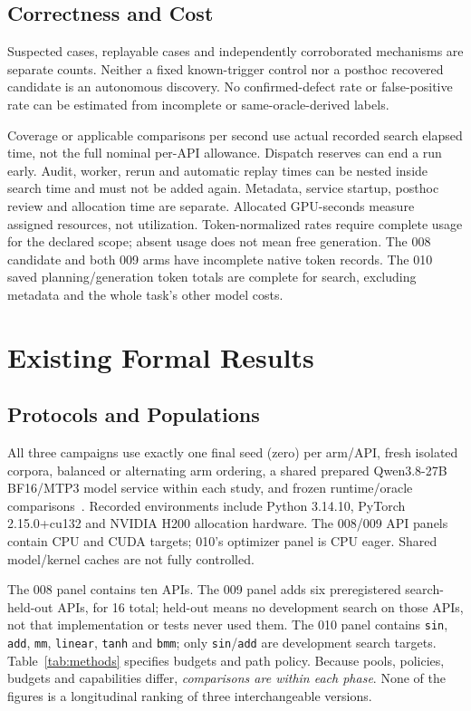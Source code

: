 \documentclass[conference]{IEEEtran}
\begin{document}
\subsection{Correctness and Cost}
Suspected cases, replayable cases and independently corroborated mechanisms are separate counts. Neither a fixed known-trigger control nor a posthoc recovered candidate is an autonomous discovery. No confirmed-defect rate or false-positive rate can be estimated from incomplete or same-oracle-derived labels.

Coverage or applicable comparisons per second use actual recorded search elapsed time, not the full nominal per-API allowance. Dispatch reserves can end a run early. Audit, worker, rerun and automatic replay times can be nested inside search time and must not be added again. Metadata, service startup, posthoc review and allocation time are separate. Allocated GPU-seconds measure assigned resources, not utilization. Token-normalized rates require complete usage for the declared scope; absent usage does not mean free generation. The 008 candidate and both 009 arms have incomplete native token records. The 010 saved planning/generation token totals are complete for search, excluding metadata and the whole task's other model costs.

\section{Existing Formal Results}
\subsection{Protocols and Populations}
All three campaigns use exactly one final seed (zero) per arm/API, fresh isolated corpora, balanced or alternating arm ordering, a shared prepared Qwen3.8-27B BF16/MTP3 model service within each study, and frozen runtime/oracle comparisons~\cite{result008,result009,result010}. Recorded environments include Python 3.14.10, PyTorch 2.15.0+cu132 and NVIDIA H200 allocation hardware. The 008/009 API panels contain CPU and CUDA targets; 010's optimizer panel is CPU eager. Shared model/kernel caches are not fully controlled.

The 008 panel contains ten APIs. The 009 panel adds six preregistered search-held-out APIs, for 16 total; held-out means no development search on those APIs, not that implementation or tests never used them. The 010 panel contains \texttt{sin}, \texttt{add}, \texttt{mm}, \texttt{linear}, \texttt{tanh} and \texttt{bmm}; only \texttt{sin}/\texttt{add} are development search targets. Table~\ref{tab:methods} specifies budgets and path policy. Because pools, policies, budgets and capabilities differ, \emph{comparisons are within each phase}. None of the figures is a longitudinal ranking of three interchangeable versions.
\end{document}
